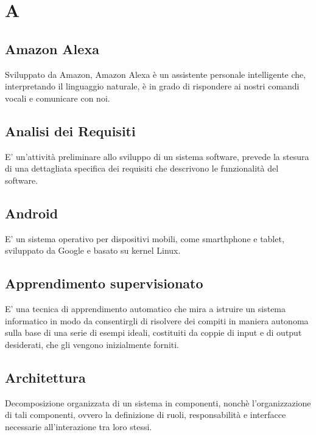 \section*{A}

\subsection{Amazon Alexa}
Sviluppato da Amazon, Amazon Alexa è un assistente personale intelligente che, interpretando il linguaggio naturale, è in grado di rispondere ai nostri comandi vocali e comunicare con noi. 
\subsection{Analisi dei Requisiti}
E' un'attività preliminare allo sviluppo di un sistema software, prevede la stesura di una dettagliata specifica dei requisiti che descrivono le funzionalità del software.

\subsection{Android}
E' un sistema operativo per dispositivi mobili, come smarthphone e tablet, sviluppato da Google e basato su kernel Linux.

\subsection{Apprendimento supervisionato}
E' una tecnica di apprendimento automatico che mira a istruire un sistema informatico in modo da consentirgli di risolvere dei compiti in maniera autonoma sulla base di una serie di esempi ideali, costituiti da coppie di input e di output desiderati, che gli vengono inizialmente forniti.

\subsection{Architettura}
Decomposizione organizzata di un sistema in componenti, nonchè l'organizzazione di tali componenti, ovvero la definizione di ruoli, responsabilità e interfacce necessarie all'interazione tra loro stessi.